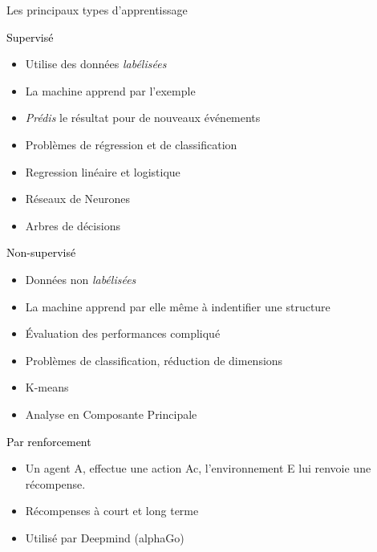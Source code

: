 \documentclass[11pt]{beamer}
\begin{document}
\begin{frame}{Les principaux types d'apprentissage}
  \hspace{0.25\textwidth}
  \begin{beamerboxesrounded}[scheme=suppervise,width=0.5\textwidth]{\textcolor{black}{Supervisé}}
    \begin{itemize}
      \tiny
    \item Utilise des données \textit{labélisées}
    \item La machine apprend par l'exemple
    \item \textit{Prédis} le résultat pour de nouveaux événements
    \item Problèmes de régression et de classification
    \item Regression linéaire et logistique
    \item Réseaux de Neurones
    \item Arbres de décisions
    \end{itemize}
  \end{beamerboxesrounded}

  \vfill
  
  \begin{minipage}{.5\textwidth}
    \begin{beamerboxesrounded}[scheme=suppervise,width=0.95\textwidth]{\textcolor{black}{Non-supervisé}}
      \begin{itemize}
        \tiny
      \item Données non \textit{labélisées}
      \item La machine apprend par elle même à indentifier une structure
      \item Évaluation des performances compliqué
      \item Problèmes de classification, réduction de dimensions
      \item K-means
      \item Analyse en Composante Principale
      \end{itemize}
    \end{beamerboxesrounded}
  \end{minipage}
  \hfill
  \begin{minipage}{.5\textwidth}
    \begin{beamerboxesrounded}[scheme=suppervise,width=0.95\textwidth]{\textcolor{black}{Par renforcement}}
      \vspace{0.5cm}
      \begin{itemize}
        \tiny
      \item Un agent A, effectue une action Ac, l'environnement E lui renvoie une récompense.
      \item Récompenses à court et long terme
      \item Utilisé par Deepmind (alphaGo)
      \end{itemize}
      \vspace{0.5cm}
    \end{beamerboxesrounded}
  \end{minipage}  
\end{frame}
\end{document}
